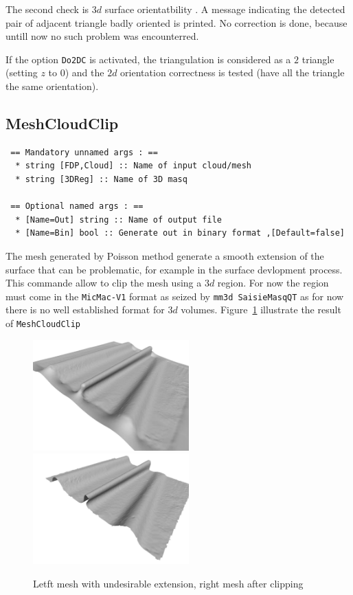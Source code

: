 The second check is $3d$ surface orientatbility . A message indicating the detected
pair of adjacent triangle badly oriented is printed.  No correction is
done, because untill now no such problem was encounterred.

If the option {\tt Do2DC} is activated, the triangulation is considered
as a $2$ triangle (setting $z$ to $0$) and  the $2d$ orientation correctness is
tested (have all the triangle the same orientation).


\subsection{MeshCloudClip}

\begin{verbatim}
 == Mandatory unnamed args : ==
  * string [FDP,Cloud] :: Name of input cloud/mesh
  * string [3DReg] :: Name of 3D masq

 == Optional named args : ==
  * [Name=Out] string :: Name of output file
  * [Name=Bin] bool :: Generate out in binary format ,[Default=false]
\end{verbatim}


The mesh generated by Poisson method generate a smooth extension of the surface
that can be problematic, for example in the surface devlopment process. This
commande allow to clip the mesh using a $3d$ region.  For now the region
must come in the {\tt MicMac-V1} format as seized by {\tt mm3d SaisieMasqQT}
as for now there is no well established format for $3d$ volumes.
Figure~\ref{fig:MeshClip} illustrate the result of {\tt MeshCloudClip}

\begin{figure}
\centering
\includegraphics[width=6cm]{CommandReferences/ImagesComRef/MeshWithSkirt.jpg}
\includegraphics[width=6cm]{CommandReferences/ImagesComRef/MeshCliped.jpg}
\caption{Letft mesh with undesirable extension, right mesh after clipping}
\label{fig:MeshClip}
\end{figure}



